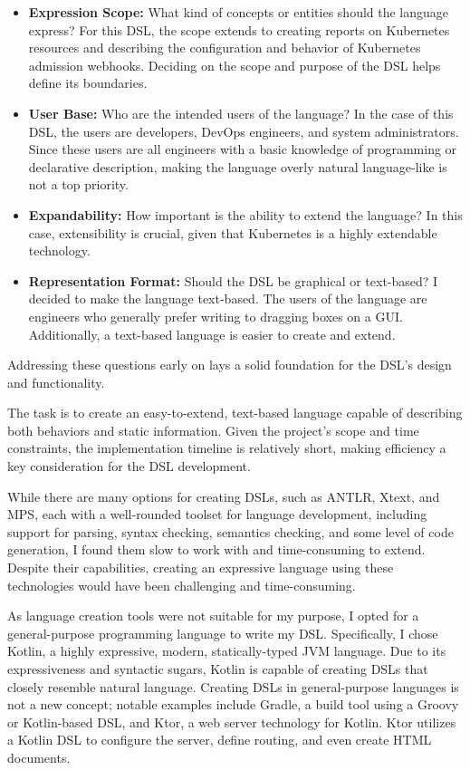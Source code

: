 \begin{itemize}
    \item \textbf{Expression Scope:} What kind of concepts or entities should the language express? For this DSL, the scope extends to creating reports on Kubernetes resources and describing the configuration and behavior of Kubernetes admission webhooks. Deciding on the scope and purpose of the DSL helps define its boundaries.
    \item \textbf{User Base:} Who are the intended users of the language? In the case of this DSL, the users are developers, DevOps engineers, and system administrators. Since these users are all engineers with a basic knowledge of programming or declarative description, making the language overly natural language-like is not a top priority.
    \item \textbf{Expandability:} How important is the ability to extend the language? In this case, extensibility is crucial, given that Kubernetes is a highly extendable technology.
    \item \textbf{Representation Format:} Should the DSL be graphical or text-based? I decided to make the language text-based. The users of the language are engineers who generally prefer writing to dragging boxes on a GUI. Additionally, a text-based language is easier to create and extend.
\end{itemize}

Addressing these questions early on lays a solid foundation for the DSL's design and functionality.

The task is to create an easy-to-extend, text-based language capable of describing both behaviors and static information. Given the project's scope and time constraints, the implementation timeline is relatively short, making efficiency a key consideration for the DSL development.

While there are many options for creating DSLs, such as ANTLR, Xtext, and MPS, each with a well-rounded toolset for language development, including support for parsing, syntax checking, semantics checking, and some level of code generation, I found them slow to work with and time-consuming to extend. Despite their capabilities, creating an expressive language using these technologies would have been challenging and time-consuming.

As language creation tools were not suitable for my purpose, I opted for a general-purpose programming language to write my DSL. Specifically, I chose Kotlin, a highly expressive, modern, statically-typed JVM language. Due to its expressiveness and syntactic sugars, Kotlin is capable of creating DSLs that closely resemble natural language. Creating DSLs in general-purpose languages is not a new concept; notable examples include Gradle, a build tool using a Groovy or Kotlin-based DSL, and Ktor, a web server technology for Kotlin. Ktor utilizes a Kotlin DSL to configure the server, define routing, and even create HTML documents.

